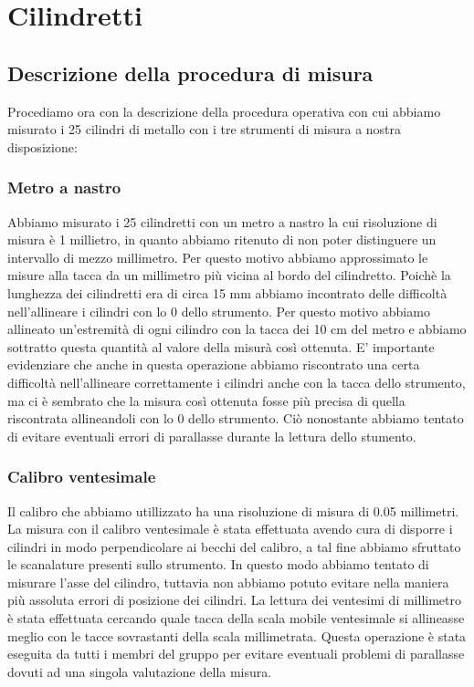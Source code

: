 \section{Cilindretti}

\subsection{Descrizione della procedura di misura}
Procediamo ora con la descrizione della procedura operativa con cui
abbiamo misurato i 25 cilindri di metallo con i tre strumenti di
misura a nostra disposizione:

\subsubsection{Metro a nastro}
Abbiamo misurato i 25 cilindretti con un metro a nastro la cui risoluzione
di misura è 1 millietro, in quanto abbiamo ritenuto di non poter distinguere
un intervallo di mezzo millimetro. Per questo motivo abbiamo approssimato
le misure alla tacca da un millimetro più vicina al bordo del cilindretto.
Poichè la lunghezza dei cilindretti era di circa 15 mm abbiamo incontrato
delle difficoltà nell'allineare i cilindri con lo 0 dello strumento.
Per questo motivo abbiamo allineato un'estremità di ogni cilindro con la
tacca dei 10 cm del metro e abbiamo sottratto questa quantità al valore
della misurà così ottenuta. E' importante evidenziare che anche in questa
operazione abbiamo riscontrato una certa difficoltà nell'allineare correttamente
i cilindri anche con la tacca dello strumento, ma ci è sembrato che la
misura così ottenuta fosse più precisa di quella riscontrata allineandoli
con lo 0 dello strumento. Ciò nonostante abbiamo tentato di evitare
eventuali errori di parallasse durante la lettura dello stumento.

\subsubsection{Calibro ventesimale}
Il calibro che abbiamo utillizzato ha una risoluzione di misura di 0.05
millimetri. La misura con il calibro ventesimale è stata effettuata avendo
cura di disporre i cilindri in modo perpendicolare ai becchi del calibro,
a tal fine abbiamo sfruttato le scanalature presenti sullo strumento.
In questo modo abbiamo tentato di misurare l'asse del cilindro, tuttavia
non abbiamo potuto evitare nella maniera più assoluta errori di posizione
dei cilindri.
La lettura dei ventesimi di millimetro è stata effettuata cercando quale
tacca della scala mobile ventesimale si allineasse meglio con le tacce
sovrastanti della scala millimetrata. Questa operazione è stata eseguita
da tutti i membri del gruppo per evitare eventuali problemi di parallasse
dovuti ad una singola valutazione della misura.

